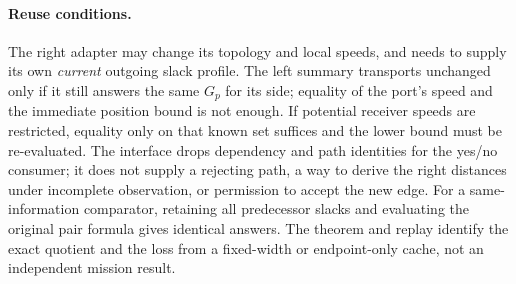 \documentclass[11pt]{article}
\begin{document}
\paragraph{Reuse conditions.}
The right adapter may change its topology and local speeds, and needs to supply its own \emph{current} outgoing slack profile. The left summary transports unchanged only if it still answers the same $G_p$ for its side; equality of the port's speed and the immediate position bound is not enough. If potential receiver speeds are restricted, equality only on that known set suffices and the lower bound must be re-evaluated. The interface drops dependency and path identities for the yes/no consumer; it does not supply a rejecting path, a way to derive the right distances under incomplete observation, or permission to accept the new edge. For a same-information comparator, retaining all predecessor slacks and evaluating the original pair formula gives identical answers. The theorem and replay identify the exact quotient and the loss from a fixed-width or endpoint-only cache, not an independent mission result.
\end{document}

